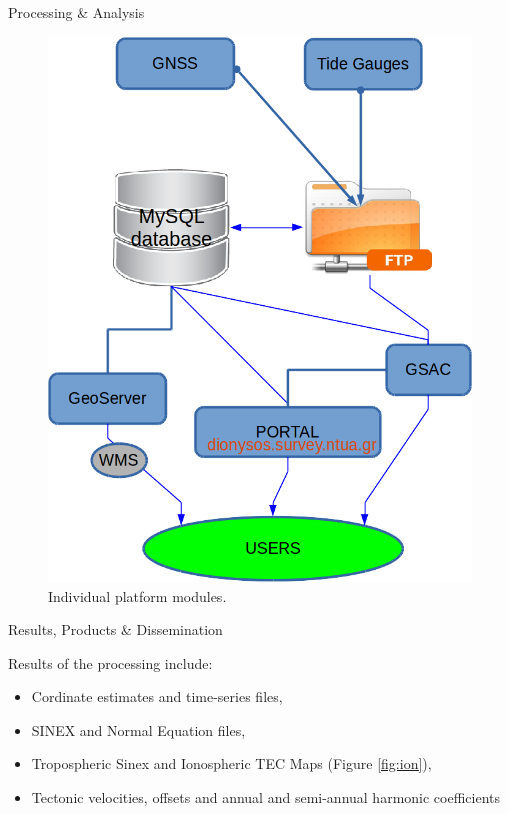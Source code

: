 \documentclass[final,a0,portrait]{beamer}
\newlength{\onecolwid}
\begin{document}
\begin{frame}[t]
\begin{columns}[t]
\begin{column}{\onecolwid}
\begin{block}{Processing \& Analysis}
\begin{figure}
\begin{minipage}{.45\textwidth}
    \includegraphics[width=.8\linewidth]{flowc.png}
    \caption{Individual platform modules.}
    \label{fig:flowc}
\end{minipage}
\end{figure}
\end{block}


\begin{block}{Results, Products \& Dissemination}
{\small
Results of the processing include:\\
\begin{itemize}
\item Cordinate estimates and time-series files,
\item SINEX and Normal Equation files,
\item Tropospheric Sinex and Ionospheric TEC Maps (Figure \ref{fig:ion}),
\item Tectonic velocities, offsets and annual and semi-annual harmonic coefficients
\end{itemize}

}
\end{block}
\end{column}
\end{columns}
\end{frame}
\end{document}
